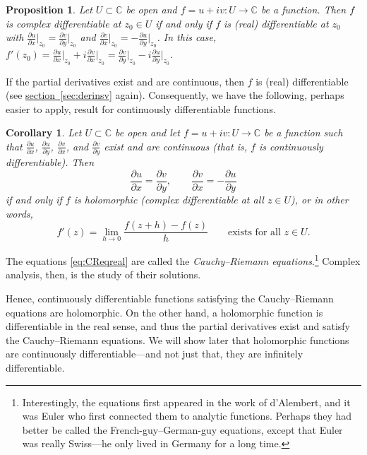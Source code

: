 \documentclass[12pt,openany]{book}
\newcommand{\C}{{\mathbb{C}}}
\newcommand{\myindex}[1]{#1\index{#1}}
\theoremstyle{plain}
\newtheorem{prop}[thm]{Proposition}
\newtheorem{cor}[thm]{Corollary}
\theoremstyle{remark}
\theoremstyle{definition}
\theoremstyle{exercise}
\theoremstyle{example}
\newcommand{\sectionref}[1]{\hyperref[#1]{section~\ref*{#1}}}
\begin{document}
\begin{prop}
Let $U \subset \C$ be open and $f = u+iv \colon U \to \C$ be a function.
Then
$f$ is complex differentiable at $z_0 \in U$
if and only if
$f$ is (real) differentiable at $z_0$
with
$\frac{\partial u}{\partial x}\big|_{z_0} =
\frac{\partial v}{\partial y}\big|_{z_0}$
and
$\frac{\partial v}{\partial x}\big|_{z_0} =
-\frac{\partial u}{\partial y}\big|_{z_0}$.
In this case,
$f'(z_0) = 
\frac{\partial u}{\partial x}\big|_{z_0} + i \frac{\partial v}{\partial
x}\big|_{z_0} = \frac{\partial v}{\partial y}\big|_{z_0} - i \frac{\partial
u}{\partial y}\big|_{z_0}$.
\end{prop}

If the partial derivatives exist and are continuous, then $f$ is
(real) differentiable (see \sectionref{sec:derinsv} again).
Consequently, we have the following, perhaps easier to apply, result
for continuously differentiable functions.

\begin{cor}
Let $U \subset \C$ be open and let $f = u+iv \colon U \to \C$ be a function
such that $\frac{\partial u}{\partial x}$, $\frac{\partial u}{\partial y}$, $\frac{\partial
v}{\partial x}$, and $\frac{\partial v}{\partial y}$ exist and are continuous (that is,
$f$ is continuously differentiable).
Then
\begin{equation} \label{eq:CReqreal}
\frac{\partial u}{\partial x} = \frac{\partial v}{\partial y} , \qquad
\frac{\partial v}{\partial x} = -\frac{\partial u}{\partial y}
\end{equation}
if and only if $f$ is holomorphic (complex differentiable at all $z \in U$),
or in other words,
\begin{equation*}
f'(z) =
\lim_{h \to 0} \frac{f(z+h) - f(z)}{h}
\qquad
\text{exists for all $z \in U$.}
\end{equation*}
\end{cor}

The equations \eqref{eq:CReqreal} are called the
\emph{\myindex{Cauchy--Riemann equations}}.\footnote{Interestingly,
the equations first appeared in the work of d'Alembert, and
it was Euler who first connected them to analytic functions.
Perhaps they had better be called the French-guy--German-guy equations,
except that Euler was really Swiss---he only lived in Germany for a long time.}
Complex analysis, then, is the study of their solutions.

Hence, continuously differentiable functions satisfying
the Cauchy--Riemann equations are holomorphic.
On the other hand,
a holomorphic function is differentiable in the real sense,
and thus the partial derivatives exist and satisfy the Cauchy--Riemann
equations.  We will show later that holomorphic functions are
continuously differentiable---and not just that, they are
infinitely differentiable.
\end{document}
